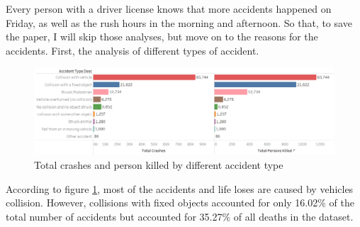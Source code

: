 \documentclass[10pt]{article}
\theoremstyle{definition}
\begin{document}
Every person with a driver license knows that more accidents happened on Friday, as well as the rush hours in the morning and afternoon. So that, to save the paper, I will skip those analyses, but move on to the reasons for the accidents. First, the analysis of different types of accident.  \par

\begin{figure}[H] %
	\centering
	\includegraphics[width=\linewidth]{images/accidentType.png}
	\caption{Total crashes and person killed by different accident type}
	\label{fig:accidentType}
\end{figure}
According to figure \ref{fig:accidentType}, most of the accidents and life loses are caused by vehicles collision. However, collisions with fixed objects accounted for only 16.02$\%$ of the total number of accidents but accounted for 35.27$\%$ of all deaths in the dataset. \par 
\end{document}
